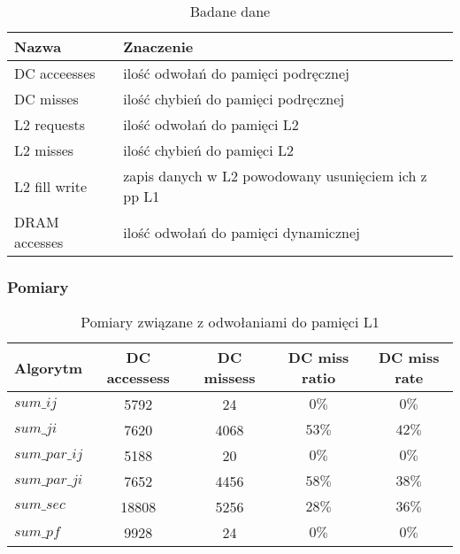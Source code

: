 \begin{table}[H]
\caption{Badane dane}
\begin{tabular}{|l|l|}

\hline
  Nazwa &
  Znaczenie \\
\hline
  DC acceesses &
  ilość odwołań do pamięci podręcznej \\
\hline
  DC misses &
  ilość chybień do pamięci podręcznej \\
\hline
  L2 requests &
  ilość odwołań do pamięci L2 \\
\hline
  L2 misses &
  ilość chybień do pamięci L2 \\
\hline
  L2 fill write &
  zapis danych w L2 powodowany usunięciem ich z pp L1 \\
\hline
  DRAM accesses &
  ilość odwołań do pamięci dynamicznej \\
\hline

\end{tabular}
\end{table}


\subsubsection{Pomiary}

\begin{table}[H]
\caption{Pomiary związane z odwołaniami do pamięci L1}

\begin{tabular}{|l|c|c|c|c|}

\hline
  Algorytm &
  DC accessess &
  DC missess &
  DC miss ratio &
  DC miss rate \\

\hline
  $sum\_ij$ &
  5792 &
  24 &
  $0\%$ &
  $0\%$ \\

\hline
  $sum\_ji$ &
  7620 &
  4068 &
  $53\%$ &
  $42\%$ \\

\hline
  $sum\_par\_ij$ &
  5188 &
  20 &
  $0\%$ &
  $0\%$ \\

\hline
  $sum\_par\_ji$ &
  7652 &
  4456 &
  $58\%$ &
  $38\%$ \\

\hline
  $sum\_sec$ &
  18808 &
  5256 &
  $28\%$ &
  $36\%$ \\

\hline
  $sum\_pf$ &
  9928 &
  24 &
  $0\%$ &
  $0\%$ \\

\hline

\end{tabular}

\end{table}



